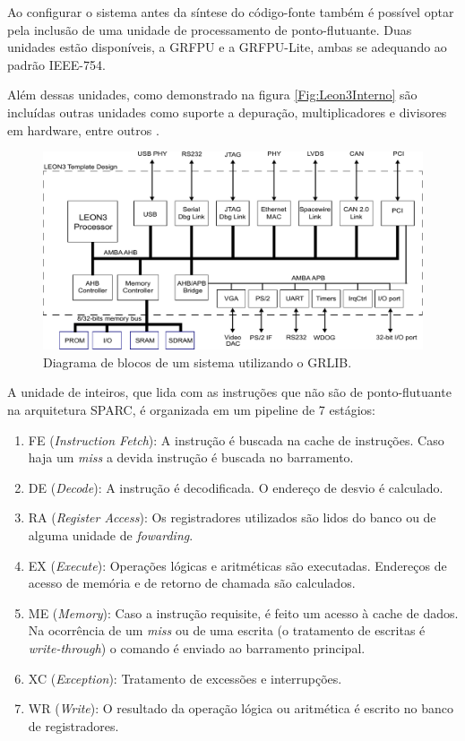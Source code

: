 Ao configurar o sistema antes da síntese do código-fonte também é possível optar pela inclusão de uma unidade de processamento de ponto-flutuante. Duas unidades estão disponíveis, a GRFPU e a GRFPU-Lite, ambas se adequando ao padrão IEEE-754.

Além dessas unidades, como demonstrado na figura \ref{Fig:Leon3Interno} são incluídas outras unidades como suporte a depuração, multiplicadores e divisores em hardware, entre outros \cite{grlibmanual}.


\begin{figure}
	\label{Fig:Leon3Externo}
	\caption[Diagrama de blocos de um sistema utilizando o GRLIB]{
		Diagrama de blocos de um sistema utilizando o GRLIB.}
	\begin{center}
		\includegraphics[width=\linewidth]{fig/leon3externo.pdf}
	\end{center}
\end{figure}

A unidade de inteiros, que lida com as instruções que não são de ponto-flutuante na arquitetura SPARC, é organizada em um pipeline de 7 estágios:

\begin{enumerate}
	\item FE (\textit{Instruction Fetch}): A instrução é buscada na cache de instruções. Caso haja um \textit{miss} a devida instrução é buscada no barramento.
	\item DE (\textit{Decode}): A instrução é decodificada. O endereço de desvio é calculado.
	\item RA (\textit{Register Access}): Os registradores utilizados são lidos do banco ou de alguma unidade de \textit{fowarding}.
	\item EX (\textit{Execute}): Operações lógicas e aritméticas são executadas. Endereços de acesso de memória e de retorno de chamada são calculados.
	\item ME (\textit{Memory}): Caso a instrução requisite, é feito um acesso à cache de dados. Na ocorrência de um \textit{miss} ou de uma escrita (o tratamento de escritas é \textit{write-through}) o comando é enviado ao barramento principal.
	\item XC (\textit{Exception}): Tratamento de excessões e interrupções.
	\item WR (\textit{Write}): O resultado da operação lógica ou aritmética é escrito no banco de registradores.
\end{enumerate}

